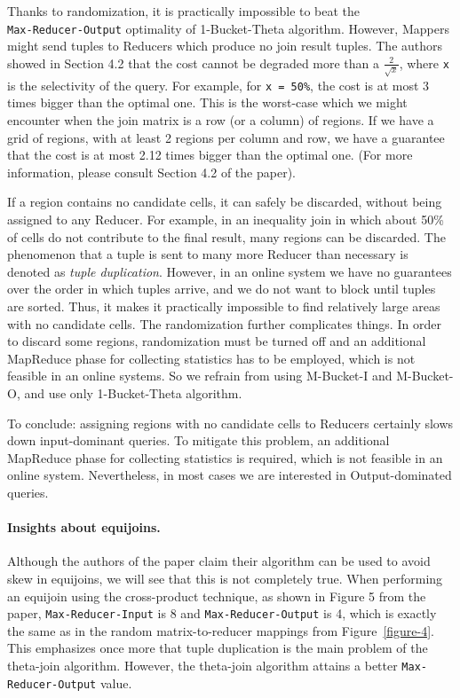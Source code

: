 \documentclass[a4paper,10pt]{article}
\begin{document}
Thanks to randomization, it is practically impossible to beat the\\
\verb#Max-Reducer-Output# optimality of 1-Bucket-Theta algorithm. However, Mappers might send tuples to Reducers which produce no join result tuples. The authors showed in Section 4.2 that the cost cannot be degraded more than a $\frac{2}{\sqrt{x}}$, where \verb#x# is the selectivity of the query. For example, for \verb#x = 50%#, the cost is at most 3 times bigger than the optimal one. This is the worst-case which we might encounter when the join matrix is a row (or a column) of regions. If we have a grid of regions, with at least 2 regions per column and row, we have a guarantee that the cost is at most 2.12 times bigger than the optimal one. (For more information, please consult Section 4.2 of the paper). 

If a region contains no candidate cells, it can safely be discarded, without being assigned to any Reducer. For example, in an inequality join in which about 50\% of cells do not contribute to the final result, many regions can be discarded. The phenomenon that a tuple is sent to many more Reducer than necessary is denoted as \textit{tuple duplication}. However, in an online system we have no guarantees over the order in which tuples arrive, and we do not want to block until tuples are sorted. Thus, it makes it practically impossible to find relatively large areas with no candidate cells. The randomization further complicates things. In order to discard some regions, randomization must be turned off and an additional MapReduce phase for collecting statistics has to be employed, which is not feasible in an online systems. So we refrain from using M-Bucket-I and M-Bucket-O, and use only 1-Bucket-Theta algorithm.

To conclude: assigning regions with no candidate cells to Reducers certainly slows down input-dominant queries. To mitigate this problem, an additional MapReduce phase for collecting statistics is required, which is not feasible in an online system. Nevertheless, in most cases we are interested in Output-dominated queries.

\paragraph{Insights about equijoins.} Although the authors of the paper claim their algorithm can be used to avoid skew in equijoins, we will see that this is not completely true. When performing an equijoin using the cross-product technique, as shown in Figure 5 from the paper, \verb#Max-Reducer-Input# is 8 and \verb#Max-Reducer-Output# is 4, which is exactly the same as in the random matrix-to-reducer mappings from Figure~\ref{figure-4}. This emphasizes once more that tuple duplication is the main problem of the theta-join algorithm. However, the theta-join algorithm attains a better \verb#Max-Reducer-Output# value.
\end{document}
